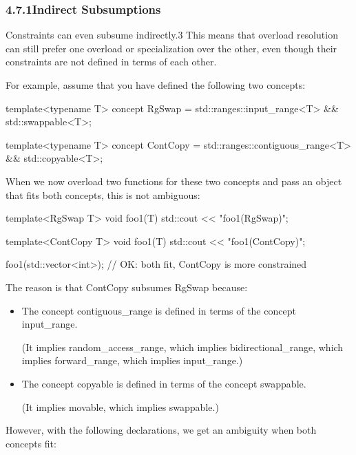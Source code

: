 \subsubsection*{ 4.7.1\hspace{0.2cm}Indirect Subsumptions}

Constraints can even subsume indirectly.3 This means that overload resolution can still prefer one overload
or specialization over the other, even though their constraints are not defined in terms of each other.

For example, assume that you have defined the following two concepts:

\begin{cpp}
template<typename T>
concept RgSwap = std::ranges::input_range<T> && std::swappable<T>;

template<typename T>
concept ContCopy = std::ranges::contiguous_range<T> && std::copyable<T>;
\end{cpp}

When we now overload two functions for these two concepts and pass an object that fits both concepts, this is not ambiguous:

\begin{cpp}
template<RgSwap T>
void foo1(T) {
	std::cout << "foo1(RgSwap)\n";
}

template<ContCopy T>
void foo1(T) {
	std::cout << "foo1(ContCopy)\n";
}

foo1(std::vector<int>{}); // OK: both fit, ContCopy is more constrained
\end{cpp}

The reason is that ContCopy subsumes RgSwap because:

\begin{itemize}
\item
The concept contiguous\_range is defined in terms of the concept input\_range.

(It implies random\_access\_range, which implies bidirectional\_range, which implies forward\_range, which implies input\_range.)

\item
The concept copyable is defined in terms of the concept swappable.

(It implies movable, which implies swappable.)
\end{itemize}

However, with the following declarations, we get an ambiguity when both concepts fit:

